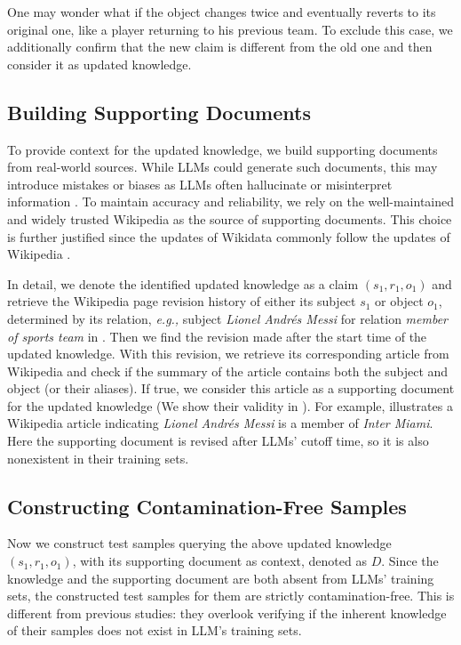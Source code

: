 \documentclass[11pt]{article}
\newcommand{\eg}{\emph{e.g.,}\xspace}
\begin{document}
        One may wonder what if the object changes twice and eventually reverts to its original one, like a player returning to his previous team.
        To exclude this case, we additionally confirm that the new claim is different from the old one
        and then consider it as updated knowledge.

    \subsection{Building Supporting Documents}
        To provide context for the updated knowledge, we build supporting documents from real-world sources.
        While LLMs could generate such documents, this may introduce mistakes or biases as LLMs often hallucinate or misinterpret information \cite{white2024livebench}.
        To maintain accuracy and reliability, we rely on the well-maintained and widely trusted Wikipedia as the source of supporting documents.
        This choice is further justified since the updates of Wikidata commonly follow the updates of Wikipedia \cite{wikidata2014}.

        In detail, we denote the identified updated knowledge as a claim $(s_{1}, r_{1}, o_{1})$
        and retrieve the Wikipedia page revision history of either its subject $s_{1}$ or object $o_{1}$, determined by its relation,
        \eg subject \textit{Lionel Andrés Messi} for relation \textit{member of sports team} in .
        Then we find the revision made after the start time of the updated knowledge.
        With this revision, we retrieve its corresponding article from Wikipedia
        and check if the summary of the article contains both the subject and object (or their aliases).
        If true, we consider this article as a supporting document for the updated knowledge (We show their validity in ).
        For example,  illustrates a Wikipedia article indicating \textit{Lionel Andrés Messi} is
        a member of \textit{Inter Miami}.
        Here the supporting document is revised after LLMs' cutoff time, so it is also nonexistent in their training sets.

    \subsection{Constructing Contamination-Free Samples} \label{sec_construct_samples}
        Now we construct test samples querying the above updated knowledge $(s_{1}, r_{1}, o_{1})$,
        with its supporting document as context, denoted as $D$.
        Since the knowledge and the supporting document are both absent from LLMs' training sets,
        the constructed test samples for them are strictly contamination-free.
        This is different from previous studies: they overlook verifying if the inherent knowledge of their samples does not exist in LLM's training sets.
\end{document}
